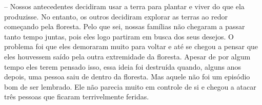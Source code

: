-- Nossos antecedentes decidiram usar a terra para plantar e viver do que ela produzisse. No entanto, os outros decidiram explorar as terras ao redor começando pela floresta. Pelo que sei, nossas famílias não chegaram a passar tanto tempo juntas, pois eles logo partiram em busca dos seus desejos. O problema foi que eles demoraram muito para voltar e até se chegou a pensar que eles houvessem saído pela outra extremidade da floresta. Apesar de por algum tempo eles terem pensado isso, essa ideia foi destruída quando, alguns anos depois, uma pessoa saiu de dentro da floresta. Mas aquele não foi um episódio bom de ser lembrado. Ele não parecia muito em controle de si e chegou a atacar três pessoas que ficaram terrivelmente feridas.